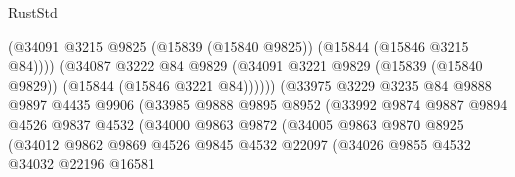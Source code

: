 \begin{lexlean}{RustStd}
\begin{coremodule}
                                        (@34091
                                          @3215
                                          @9825
                                          (@15839 (@15840 @9825))
                                          (@15844 (@15846 @3215 @84))))
                                      (@34087
                                        @3222
                                        @84
                                        @9829
                                        (@34091
                                          @3221
                                          @9829
                                          (@15839 (@15840 @9829))
                                          (@15844 (@15846 @3221 @84))))))
                                  (@33975
                                    @3229
                                    @3235
                                    @84
                                    @9888
                                    @9897
                                    @4435
                                    @9906
                                    (@33985
                                      @9888
                                      @9895
                                      @8952
                                      (@33992
                                        @9874
                                        @9887
                                        @9894
                                        @4526
                                        @9837
                                        @4532
                                        (@34000
                                          @9863
                                          @9872
                                          (@34005
                                            @9863
                                            @9870
                                            @8925
                                            (@34012
                                              @9862
                                              @9869
                                              @4526
                                              @9845
                                              @4532
                                              @22097
                                              (@34026
                                                @9855
                                                @4532
                                                @34032
                                                @22196
                                                @16581

\end{coremodule}
\end{lexlean}
